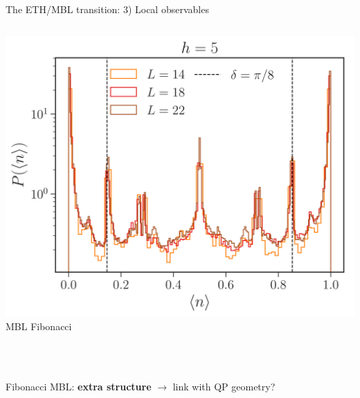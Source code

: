 \begin{frame}{The ETH/MBL transition: 3) Local observables}
\begin{columns}
\begin{column}{0.33\textwidth}
\centering
\includegraphics[width=\textwidth]{img/3_Fibonacci/sz_MBL}
{\footnotesize MBL Fibonacci}
\end{column}
\end{columns}
~\\
~\\

Fibonacci MBL: \textbf{extra structure} $\to$ link with QP geometry?
\end{frame}

